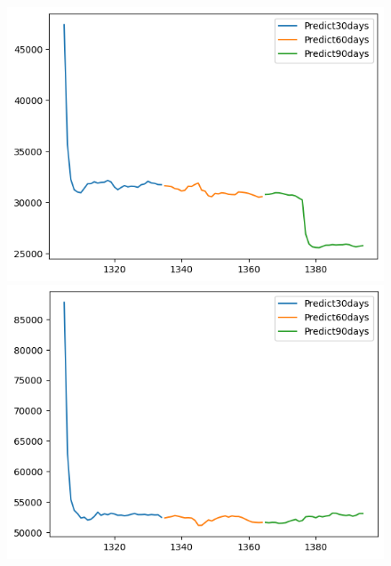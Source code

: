 \begin{figure}[H]
\begin{minipage}{0.15\textwidth}
    \end{minipage}
    \hfill
        \begin{minipage}{0.15\textwidth}
    \centering
    \includegraphics[width=1\textwidth]{resources/chapter-5/newdata1/predicted/KF_BIDV_9_1_30days.png}
    \end{minipage}
    \hfill
    \begin{minipage}{0.15\textwidth}
    \centering
    \includegraphics[width=1\textwidth]{resources/chapter-5/newdata1/predicted/KF_VCB_7_3_30days.png}
    \end{minipage}
    \hfill
    \begin{minipage}{0.15\textwidth}
    \centering

\end{minipage}
\end{figure}
